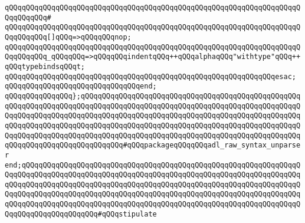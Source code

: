 \verb|qQQqqQQqqQQqqQQqqQQqqQQqqQQqqQQqqQQqqQQqqQQqqQQqqQQqqQQqqQQqqQQqqQQqqQQqqQQqqQQq#|\newline
\verb|qQQqqQQqqQQqqQQqqQQqqQQqqQQqqQQqqQQqqQQqqQQqqQQqqQQqqQQqqQQqqQQqqQQqqQQqqQQqqQQq[]qQQq=>qQQqqQQqnop;|\newline
\verb|qQQqqQQqqQQqqQQqqQQqqQQqqQQqqQQqqQQqqQQqqQQqqQQqqQQqqQQqqQQqqQQqqQQqqQQqqQQqqQQq_qQQqqQQq=>qQQqqQQqindentqQQq++qQQqalphaqQQq"withtype"qQQq++qQQqtypebindsqQQqt;|\newline
\verb|qQQqqQQqqQQqqQQqqQQqqQQqqQQqqQQqqQQqqQQqqQQqqQQqqQQqqQQqqQQqqQQqesac;|\newline
\verb|qQQqqQQqqQQqqQQqqQQqqQQqqQQqqQQqend;|\newline
\verb|qQQqqQQqqQQqqQQq};qQQqqQQqqQQqqQQqqQQqqQQqqQQqqQQqqQQqqQQqqQQqqQQqqQQqqQQqqQQqqQQqqQQqqQQqqQQqqQQqqQQqqQQqqQQqqQQqqQQqqQQqqQQqqQQqqQQqqQQqqQQqqQQqqQQqqQQqqQQqqQQqqQQqqQQqqQQqqQQqqQQqqQQqqQQqqQQqqQQqqQQqqQQqqQQqqQQqqQQqqQQqqQQqqQQqqQQqqQQqqQQqqQQqqQQqqQQqqQQqqQQqqQQqqQQqqQQqqQQqqQQqqQQqqQQqqQQqqQQqqQQqqQQqqQQqqQQqqQQqqQQqqQQqqQQqqQQqqQQqqQQqqQQqqQQqqQQqqQQqqQQqqQQqqQQqqQQqqQQq#qQQqpackageqQQqqQQqadl_raw_syntax_unparser|\newline
\verb|end;qQQqqQQqqQQqqQQqqQQqqQQqqQQqqQQqqQQqqQQqqQQqqQQqqQQqqQQqqQQqqQQqqQQqqQQqqQQqqQQqqQQqqQQqqQQqqQQqqQQqqQQqqQQqqQQqqQQqqQQqqQQqqQQqqQQqqQQqqQQqqQQqqQQqqQQqqQQqqQQqqQQqqQQqqQQqqQQqqQQqqQQqqQQqqQQqqQQqqQQqqQQqqQQqqQQqqQQqqQQqqQQqqQQqqQQqqQQqqQQqqQQqqQQqqQQqqQQqqQQqqQQqqQQqqQQqqQQqqQQqqQQqqQQqqQQqqQQqqQQqqQQqqQQqqQQqqQQqqQQqqQQqqQQqqQQqqQQqqQQqqQQqqQQqqQQqqQQqqQQqqQQqqQQq#qQQqstipulate|\newline

